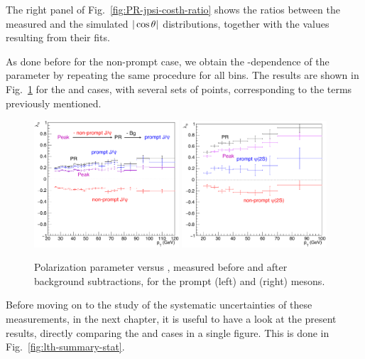 The right panel of Fig.~\ref{fig:PR-jpsi-costh-ratio} shows the ratios between
the measured and the simulated $|\cos\theta|$ distributions, 
together with the \lth values resulting from their fits.

\vfill\newpage

As done before for the non-prompt case, we obtain the \pt-dependence of 
the \lth parameter by repeating the same procedure for all \pt bins. 
The results are shown in Fig.~\ref{fig:PR-jpsi-psip-lth} for the \jpsi and \psip cases,
with several sets of points, corresponding to the terms previously mentioned.

\begin{figure}[h]
\centering
\includegraphics[width=0.48\textwidth]{Figures/chapter5/par_lth_terms-jpsiPR.pdf}
\includegraphics[width=0.48\textwidth]{Figures/chapter5/par_lth_terms-psipPR.pdf}
\caption{Polarization parameter \lth versus \pt, 
measured before and after background subtractions, 
for the prompt \jpsi (left) and \psip (right) mesons.}
\label{fig:PR-jpsi-psip-lth}
\end{figure}

Before moving on to the study of the systematic uncertainties of these measurements,
in the next chapter, it is useful to have a look at the present results,
directly comparing the \jpsi and \psip cases in a single figure.
This is done in Fig.~\ref{fig:lth-summary-stat}.

